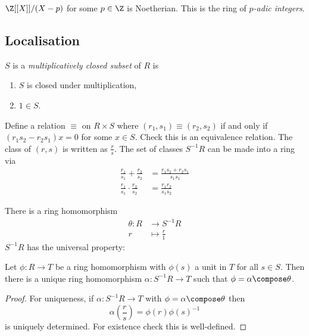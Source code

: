 \documentclass[a4paper]{article}
\begin{document}
\begin{eg}
  \(\Z[[X]]/(X - p)\) for some \(p \in \Z\) is Noetherian. This is the ring of \emph{\(p\)-adic integers}.
\end{eg}

\subsection{Localisation}

\begin{definition}
  \(S\) is a \emph{multiplicatively closed subset} of \(R\) is
  \begin{enumerate}
  \item \(S\) is closed under multiplication,
  \item \(1 \in S\).
  \end{enumerate}
\end{definition}

Define a relation \(\equiv\) on \(R \times S\) where \((r_1, s_1) \equiv (r_2, s_2)\) if and only if \((r_1s_2 - r_2s_1) x = 0\) for some \(x \in S\). Check this is an equivalence relation. The class of \((r, s)\) is written as \(\frac{r}{s}\). The set of classes \(S^{-1}R\) can be made into a ring via
\begin{align*}
  \frac{r_1}{s_1} + \frac{r_2}{s_2} &= \frac{r_1s_2 + r_2s_1}{s_1s_1} \\
  \frac{r_1}{s_1} \cdot \frac{r_2}{s_2} &= \frac{r_1r_2}{s_1s_2}
\end{align*}

There is a ring homomorphism
\begin{align*}
  \theta: R &\to S^{-1} R \\
  r &\mapsto \frac{r}{1}
\end{align*}
\(S^{-1}R\) has the universal property:

\begin{lemma}
  Let \(\phi: R \to T\) be a ring homomorphism with \(\phi(s)\) a unit in \(T\) for all \(s \in S\). Then there is a unique ring homomorphism \(\alpha: S^{-1}R \to T\) such that \(\phi = \alpha \compose \theta\).
\end{lemma}

\begin{proof}
  For uniqueness, if \(\alpha: S^{-1}R \to T\) with \(\phi = \alpha \compose \theta\) then
  \[
    \alpha(\frac{r}{s}) = \phi(r) \phi(s)^{-1}
  \]
  is uniquely determined. For existence check this is well-defined.
\end{proof}
\end{document}
